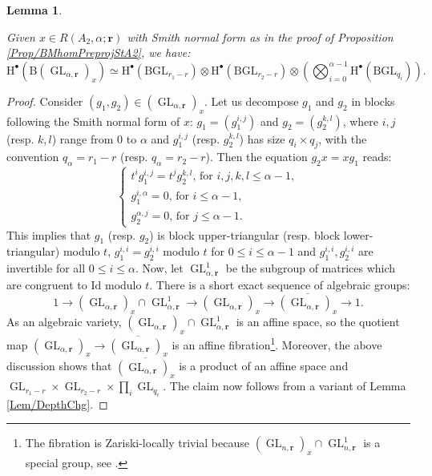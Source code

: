\documentclass[11pt,english]{article}
\numberwithin{equation}{section}
\numberwithin{figure}{section}
\theoremstyle{definition}
\theoremstyle{plain}
\newtheorem{lem}[df]{Lemma}
\theoremstyle{remark}
\DeclareMathOperator{\GL}{GL}
\newcommand\rr{\mathbf{r}}
\newcommand\HH{\mathrm{H}}
\begin{document}
\begin{lem} \label{Lem/CohStabiliser}

Given $x\in R(A_{2},\alpha;\rr)$ with Smith normal form as in the
proof of Proposition \ref{Prop/BMhomPreprojStA2}, we have:\[
\HH^{\bullet}(\mathrm{B}(\GL_{\alpha,\rr})_{x})\simeq\HH^{\bullet}(\mathrm{BGL}_{r_1-r})\otimes\HH^{\bullet}(\mathrm{BGL}_{r_2-r})\otimes\left(\bigotimes_{i=0}^{\alpha-1}\HH^{\bullet}(\mathrm{BGL}_{q_i})\right)
.
\]

\end{lem}

\begin{proof}

Consider $(g_{1},g_{2})\in(\GL_{\alpha,\rr})_{x}$. Let us decompose
$g_{1}$ and $g_{2}$ in blocks following the Smith normal form of
$x$: $g_{1}=(g_{1}^{i,j})$ and $g_{2}=(g_{2}^{k,l})$, where $i,j$
(resp. $k,l$) range from $0$ to $\alpha$ and $g_{1}^{i,j}$ (resp.
$g_{2}^{k,l}$) has size $q_{i}\times q_{j}$, with the convention
$q_{\alpha}=r_{1}-r$ (resp. $q_{\alpha}=r_{2}-r$). Then the equation
$g_{2}x=xg_{1}$ reads:\[
\left\{
\begin{array}{l}
t^ig_1^{i,j}=t^jg_2^{k,l}\text{, for }i,j,k,l\leq\alpha-1, \\
g_1^{i,\alpha}=0\text{, for }i\leq\alpha-1, \\
g_2^{\alpha,j}=0\text{, for }j\leq\alpha-1.
\end{array}
\right.
\]This implies that $g_{1}$ (resp. $g_{2}$) is block upper-triangular
(resp. block lower-triangular) modulo $t$, $g_{1}^{i,i}=g_{2}^{i,i}$
modulo $t$ for $0\leq i\leq\alpha-1$ and $g_{1}^{i,i},g_{2}^{i,i}$
are invertible for all $0\leq i\leq\alpha$. Now, let $\GL_{\alpha,\rr}^{1}$
be the subgroup of matrices which are congruent to $\mathrm{Id}$
modulo $t$. There is a short exact sequence of algebraic groups:\[
1\rightarrow (\GL_{\alpha,\rr})_{x}\cap\GL_{\alpha,\rr}^{1}\rightarrow (\GL_{\alpha,\rr})_{x}\rightarrow\overline{(\GL_{\alpha,\rr})_{x}}\rightarrow 1.
\]As an algebraic variety, $(\GL_{\alpha,\rr})_{x}\cap\GL_{\alpha,\rr}^{1}$
is an affine space, so the quotient map $(\GL_{\alpha,\rr})_{x}\rightarrow\overline{(\GL_{\alpha,\rr})_{x}}$
is an affine fibration\footnote{The fibration is Zariski-locally trivial because $(\GL_{n,\rr})_{x}\cap\GL_{n,\rr}^{1}$
is a special group, see \cite{Ser58}.}. Moreover, the above discussion shows that $\overline{(\GL_{\alpha,\rr})_{x}}$
is a product of an affine space and $\GL_{r_{1}-r}\times\GL_{r_{2}-r}\times\prod_{i}\GL_{q_{i}}$.
The claim now follows from a variant of Lemma \ref{Lem/DepthChg}.
\end{proof}
\end{document}
